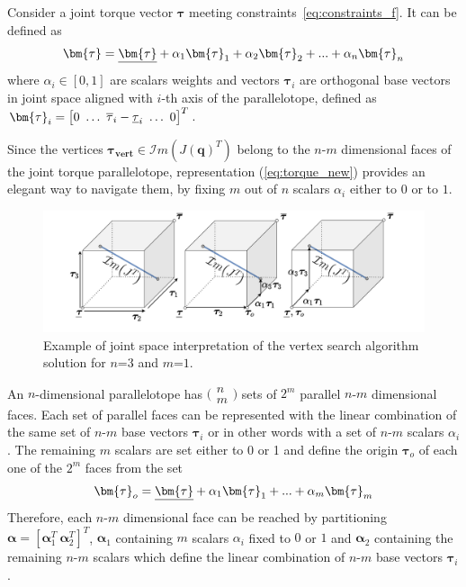 Consider a joint torque vector $\bm{\tau}$ meeting constraints~\ref{eq:constraints_f}. It can be defined as
\begin{equation}
    \bm{\tau} = \unum{\bm{\tau}} + \alpha_1 \bm{\tau}_1+ \alpha_2 \bm{\tau}_2 + ... + \alpha_n \bm{\tau}_n
    \label{eq:torque_new}
\end{equation}
where $\alpha_i \in [0,1]$ are scalars weights and vectors $\bm{\tau}_i$ are orthogonal base vectors in joint space aligned with $i$-th axis of the parallelotope, defined as $\bm{\tau}_i = \begin{bmatrix} 0~\ldots~\onum{\tau}_{i} - \unum{\tau}_{i}~\ldots~0 \end{bmatrix}^T$. 

Since the vertices $\bm{\tau_{vert}} \in \mathcal{I}m(J(\bm{q})^T)$ belong to the $n$-$m$ dimensional faces of the joint torque parallelotope, representation (\ref{eq:torque_new}) provides an elegant way to navigate them, by fixing $m$ out of $n$ scalars $\alpha_i$ either to $0$ or to $1$.

\begin{figure}[!t]
    \centering
    \hspace*{-0.5cm}
    \includegraphics[width=1.1\linewidth]{Papers/images/intersection_example.pdf}
    \caption{Example of joint space interpretation of the vertex search algorithm solution for $n$=$3$ and $m$=$1$. }
    \label{fig:intersection_example}
    \vspace*{-0.3cm}
\end{figure}

An $n$-dimensional parallelotope has $\big(\begin{smallmatrix}n\\m\end{smallmatrix}\big)$ sets of $2^m$ parallel $n$-$m$ dimensional faces. Each set of parallel faces can be represented with the linear combination of the same set of $n$-$m$ base vectors $\bm{\tau}_i$ or in other words with a set of $n$-$m$ scalars $\alpha_i$. The remaining $m$ scalars are set either to 0 or 1 and define the origin $\bm{\tau}_o$ of  each one of the $2^m$ faces from the set
\begin{equation}
    \bm{\tau}_o = \unum{\bm{\tau}} + \alpha_1 \bm{\tau}_1+ ... + \alpha_m \bm{\tau}_m
\end{equation} 
Therefore, each $n$-$m$ dimensional face can be reached by partitioning $\bm{\alpha} = \left[\bm{\alpha}_1^T ~\bm{\alpha}_2^T\right]^T$, $\bm{\alpha}_1$ containing $m$ scalars $\alpha_i$ fixed to $0$ or $1$ and $\bm{\alpha}_2$ containing the remaining $n$-$m$ scalars which define the linear combination of $n$-$m$ base vectors $\bm{\tau}_i$.

